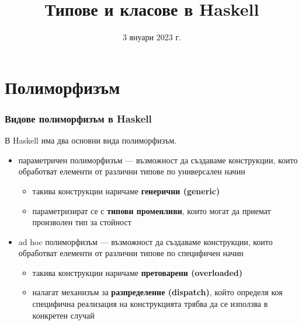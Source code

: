 \documentclass[alsotrans]{beamerswitch}
\title{Типове и класове в Haskell}
\date{3 януари 2023 г.}
\begin{document}
\begin{frame}
  \titlepage
\end{frame}

\section{Полиморфизъм}

\begin{frame}
  \frametitle{Видове полиморфизъм в Haskell}

  В Haskell има два основни вида полиморфизъм.
  \begin{itemize}[<+->]
  \item \alert{параметричен полиморфизъм} --- възможност да създаваме конструкции, които обработват елементи от различни типове по \alert{универсален} начин
    \begin{itemize}
    \item такива конструкции наричаме \textbf{генерични (generic)}
    \item параметризират се  с \textbf{типови променливи}, които могат да приемат произволен тип за стойност
    \end{itemize}
  \item \alert{ad hoc полиморфизъм} --- възможност да създаваме конструкции, които обработват елементи от различни типове по \alert{специфичен} начин
    \begin{itemize}
    \item такива конструкции наричаме \textbf{претоварени (overloaded)}
    \item налагат механизъм за \textbf{разпределение (dispatch)}, който определя коя специфична реализация на конструкцията трябва да се използва в конкретен случай
    \end{itemize}
  \end{itemize}
\end{frame}
\end{document}
